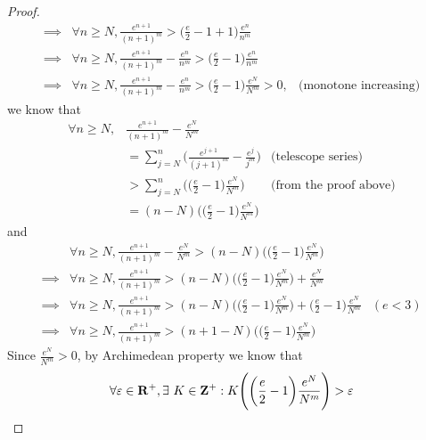 \begin{proof}
\begin{align*}
    \implies & \forall n \geq N, \frac{e^{n + 1}}{(n + 1)^m} > \bigg(\frac{e}{2} - 1 + 1\bigg) \frac{e^n}{n^m}                                                   \\
    \implies & \forall n \geq N, \frac{e^{n + 1}}{(n + 1)^m} - \frac{e^n}{n^m} > \bigg(\frac{e}{2} - 1\bigg) \frac{e^n}{n^m}                                     \\
    \implies & \forall n \geq N, \frac{e^{n + 1}}{(n + 1)^m} - \frac{e^n}{n^m} > \bigg(\frac{e}{2} - 1\bigg) \frac{e^N}{N^m} > 0, & \text{(monotone increasing)}
  \end{align*}
  we know that
  \begin{align*}
    \forall n \geq N, & \frac{e^{n + 1}}{(n + 1)^m} - \frac{e^N}{N^m}                                                              \\
                      & = \sum_{j = N}^n \bigg(\frac{e^{j + 1}}{(j + 1)^m} - \frac{e^j}{j^m}\bigg) & \text{(telescope series)}     \\
                      & > \sum_{j = N}^n \Bigg(\bigg(\frac{e}{2} - 1\bigg) \frac{e^N}{N^m}\Bigg)   & \text{(from the proof above)} \\
                      & = (n - N) \Bigg(\bigg(\frac{e}{2} - 1\bigg) \frac{e^N}{N^m}\Bigg)
  \end{align*}
  and
  \begin{align*}
             & \forall n \geq N, \frac{e^{n + 1}}{(n + 1)^m} - \frac{e^N}{N^m} > (n - N) \Bigg(\bigg(\frac{e}{2} - 1\bigg) \frac{e^N}{N^m}\Bigg)                                       \\
    \implies & \forall n \geq N, \frac{e^{n + 1}}{(n + 1)^m} > (n - N) \Bigg(\bigg(\frac{e}{2} - 1\bigg) \frac{e^N}{N^m}\Bigg) + \frac{e^N}{N^m}                                       \\
    \implies & \forall n \geq N, \frac{e^{n + 1}}{(n + 1)^m} > (n - N) \Bigg(\bigg(\frac{e}{2} - 1\bigg) \frac{e^N}{N^m}\Bigg) + \bigg(\frac{e}{2} - 1\bigg) \frac{e^N}{N^m} & (e < 3) \\
    \implies & \forall n \geq N, \frac{e^{n + 1}}{(n + 1)^m} > (n + 1 - N) \Bigg(\bigg(\frac{e}{2} - 1\bigg) \frac{e^N}{N^m}\Bigg)
  \end{align*}
  Since \(\frac{e^N}{N^m} > 0\), by Archimedean property we know that
  \begin{align*}
             & \forall \varepsilon \in \R^+, \exists\ K \in \Z^+ : K \Bigg(\bigg(\frac{e}{2} - 1\bigg) \frac{e^N}{N^m}\Bigg) > \varepsilon                                \\

\end{align*}
\end{proof}
